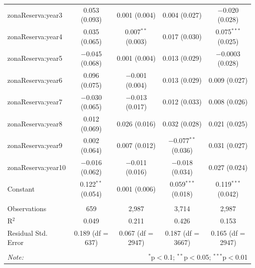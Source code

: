 \documentclass[utf8]{frontiers_suppmat} %
\begin{document}
\begin{table}[!htbp]
\begin{tabular}{@{\extracolsep{1pt}}lcccc}
  zonaReserva:year3 & 0.053 (0.093) & 0.001 (0.004) & 0.004 (0.027) & $-$0.020 (0.028) \\ 
  zonaReserva:year4 & 0.035 (0.065) & 0.007$^{**}$ (0.003) & 0.017 (0.030) & 0.075$^{***}$ (0.025) \\ 
  zonaReserva:year5 & $-$0.045 (0.068) & 0.001 (0.004) & 0.013 (0.029) & $-$0.0003 (0.028) \\ 
  zonaReserva:year6 & 0.096 (0.075) & $-$0.001 (0.004) & 0.013 (0.029) & 0.009 (0.027) \\ 
  zonaReserva:year7 & $-$0.030 (0.065) & $-$0.013 (0.017) & 0.012 (0.033) & 0.008 (0.026) \\ 
  zonaReserva:year8 & 0.012 (0.069) & 0.026 (0.016) & 0.032 (0.028) & 0.021 (0.025) \\ 
  zonaReserva:year9 & 0.002 (0.064) & 0.007 (0.012) & $-$0.077$^{**}$ (0.036) & 0.031 (0.027) \\ 
  zonaReserva:year10 & $-$0.016 (0.062) & $-$0.011 (0.016) & $-$0.018 (0.034) & 0.027 (0.024) \\ 
  Constant & 0.122$^{**}$ (0.054) & 0.001 (0.006) & 0.059$^{***}$ (0.018) & 0.119$^{***}$ (0.042) \\ 
 \hline \\[-1.8ex] 
Observations & 659 & 2,987 & 3,714 & 2,987 \\ 
R$^{2}$ & 0.049 & 0.211 & 0.426 & 0.153 \\ 
Residual Std. Error & 0.189 (df = 637) & 0.067 (df = 2947) & 0.187 (df = 3667) & 0.165 (df = 2947) \\ 
\hline 
\hline \\[-1.8ex] 
\textit{Note:}  & \multicolumn{4}{r}{$^{*}$p$<$0.1; $^{**}$p$<$0.05; $^{***}$p$<$0.01} \\ 
\end{tabular} 
\end{table}

\clearpage
\end{document}
